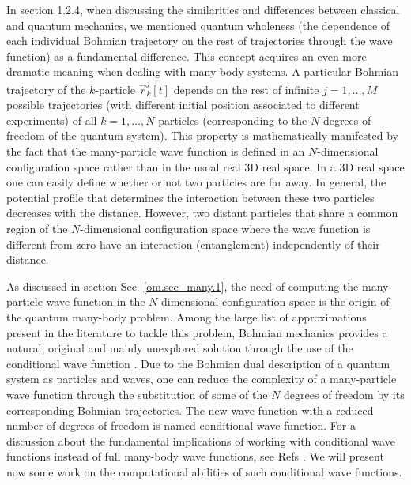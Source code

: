 \documentclass[nofootinbib, secnumarabic, amsmath, nobibnotes,11pt,aps,pra, floatfix]{revtex4-1}
\newcommand{\sref}[1]{Sec. \ref{#1}}
\begin{document}
In section 1.2.4, when discussing the similarities and differences
between classical and quantum mechanics, we mentioned quantum
wholeness (the dependence of each individual Bohmian trajectory on
the rest of trajectories through the wave function) as a fundamental
difference. This concept acquires an even more dramatic meaning when
dealing with many-body systems. A particular Bohmian trajectory of
the $k$-particle $\vec r_k^j[t]$ depends on the rest of infinite $j = 1, \ldots, M$ possible
trajectories (with different initial position associated to different experiments) of all $k = 1,\ldots, N$
particles (corresponding to the $N$ degrees of freedom of the quantum system). This property is mathematically manifested by the fact
that the many-particle wave function is defined in an $N$-dimensional
configuration space rather than in the usual real 3D real space. In a 3D
real space one can easily define whether or not two particles are
far away. In general, the potential profile that determines the
interaction between these two particles decreases with the distance.
However, two distant particles that share a common region of the
$N$-dimensional configuration space where the wave function is
different from zero have an interaction (entanglement) independently
of their distance.

As discussed in section \sref{om.sec_many.1}, the need of computing the
many-particle wave function in the $N$-dimensional configuration
space is the origin of the quantum many-body problem. Among the
large list of approximations present in the literature to tackle
this problem, Bohmian mechanics provides a natural, original and
mainly unexplored solution through the use of the conditional wave
function \cite{om.norsen}. Due to the Bohmian dual description of a quantum
system as particles and waves, one can reduce the complexity of a
many-particle wave function through the substitution of  some of the
$N$ degrees of freedom by its corresponding Bohmian trajectories.
The new wave function with a reduced number of degrees of freedom is
named conditional wave function.  For a discussion about the
fundamental implications of working with conditional wave functions
instead of full many-body wave functions, see Refs \cite{om.norsen,om.norsen2}. We will
present now  some work on the computational abilities of such
conditional wave functions.
\end{document}
